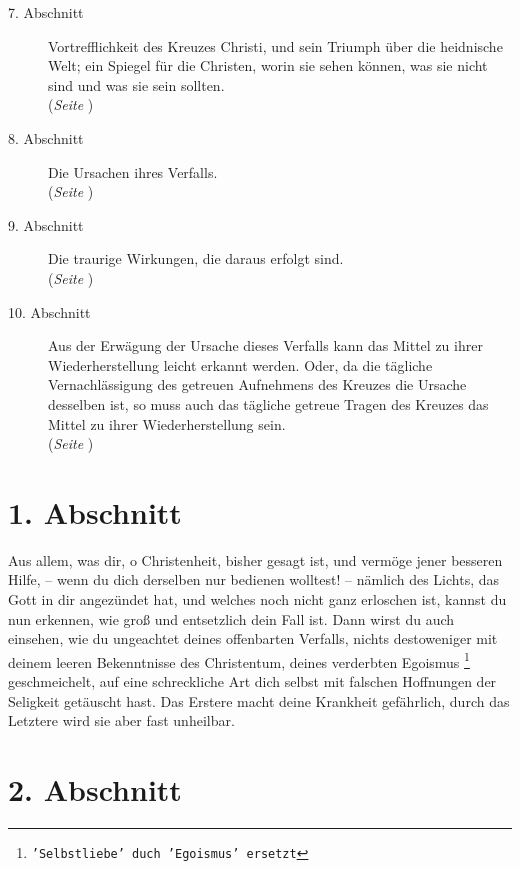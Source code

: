 \begin{description}
\item[7. Abschnitt] Vortrefflichkeit des Kreuzes Christi, und sein Triumph über
die heidnische Welt; ein Spiegel für die Christen, worin sie sehen können, was
sie nicht sind und was sie sein sollten.
\\(\textit{Seite \pageref{kap2_ab7}})
\item[8. Abschnitt] Die Ursachen ihres Verfalls.
\\(\textit{Seite \pageref{kap2_ab8}})
\item[9. Abschnitt] Die traurige Wirkungen, die daraus erfolgt sind.
\\(\textit{Seite \pageref{kap2_ab9}})
\item[10. Abschnitt] Aus der Erwägung der Ursache dieses Verfalls kann das
Mittel zu ihrer Wiederherstellung leicht erkannt werden. Oder, da die tägliche
Vernachlässigung des getreuen Aufnehmens des Kreuzes die Ursache desselben ist,
so muss auch das tägliche getreue Tragen des Kreuzes das Mittel zu ihrer
Wiederherstellung sein.
\\(\textit{Seite \pageref{kap2_ab10}})
\end{description}
\normalsize

\section{1. Abschnitt}  \label{kap2_ab1}

Aus allem, was dir, o Christenheit, bisher gesagt ist, und vermöge jener besseren
Hilfe, -- wenn du dich derselben nur bedienen wolltest! -- nämlich des Lichts,
das Gott in dir angezündet hat, und welches noch nicht ganz erloschen ist,
kannst du nun erkennen, wie groß und entsetzlich dein Fall ist. Dann wirst du
auch einsehen, wie du ungeachtet deines offenbarten Verfalls, nichts
destoweniger mit deinem leeren Bekenntnisse des Christentum, deines verderbten
Egoismus
\footnote{\texttt{'Selbstliebe' duch 'Egoismus' ersetzt}} geschmeichelt,
auf eine schreckliche Art dich selbst mit
falschen Hoffnungen der Seligkeit getäuscht hast. Das Erstere macht deine
Krankheit gefährlich, durch das Letztere wird sie aber fast unheilbar.

\section{2. Abschnitt}  \label{kap2_ab2}


